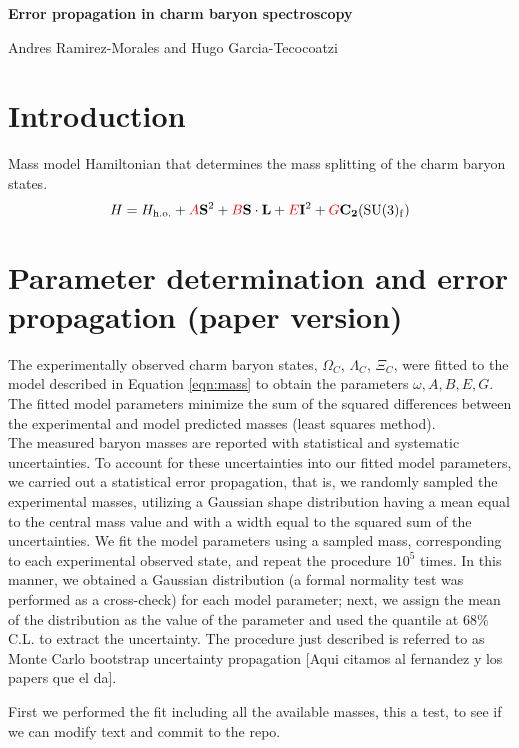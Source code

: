 \documentclass{article}
\begin{document}
\centerline{\LARGE{\textbf{Error propagation in charm baryon spectroscopy}}}
\smallskip
\centerline{Andres Ramirez-Morales and Hugo Garcia-Tecocoatzi}

\section*{Introduction}

Mass model Hamiltonian that determines the mass splitting of the charm baryon states.
\begin{equation}
\label{eqn:mass}
H = H_{\mathrm{h.o.}} + \textcolor{red}{A}\mathbf{S}^{2} + \textcolor{red}{B}\mathbf{S\cdot L} +  \textcolor{red}{E}\mathbf{I}^{2} + \textcolor{red}{G}\mathbf{C_{2}}(\mathrm{SU(3)_{f}})
\end{equation}

\section*{Parameter determination and error propagation (paper version)}

The experimentally observed charm baryon states, $\Omega_{C}$, $\Lambda_{C}$, $\Xi_{C}$, were fitted to the model described in Equation \ref{eqn:mass} to obtain the parameters $\omega, A, B, E, G$. The fitted model parameters minimize the sum of the squared differences between the experimental and model predicted masses (least squares method).\\

The measured baryon masses are reported with statistical and systematic uncertainties. To account for these uncertainties into our fitted model parameters, we carried out a statistical error propagation, that is, we randomly sampled the experimental masses, utilizing a Gaussian shape distribution having a mean equal to the central mass value and with a width equal to the squared sum of the uncertainties. We fit the model parameters using a sampled mass, corresponding to each experimental observed state, and repeat the procedure $10^5$ times. In this manner, we obtained a Gaussian distribution (a formal normality test was performed as a cross-check) for each model parameter; next, we assign the mean of the distribution as the value of the parameter and used the quantile at 68\% C.L. to extract the uncertainty. The procedure just described is referred to as Monte Carlo bootstrap uncertainty propagation [Aqui citamos al fernandez y los papers que el da].

First we performed the fit including all the available masses, this a test, to see if we can modify text and commit to the repo.
\end{document}

